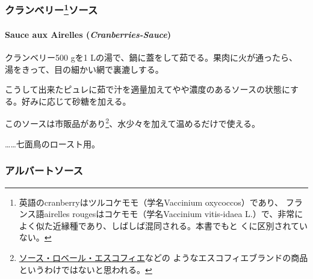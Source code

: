 \begin{recette}
\hypertarget{ux30afux30e9ux30f3ux30d9ux30eaux30fc1ux30bdux30fcux30b9}{%
\subsubsection[クランベリーソース]{\texorpdfstring{クランベリー\footnote{英語のcranberryはツルコケモモ（学名Vaccinium
  oxycoccos）であり、 フランス語airelles rougesはコケモモ（学名Vaccinium
  vitis-idaea
  L.）で、非常によく似た近縁種であり、しばしば混同される。本書でもと
  くに区別されていない。}ソース}{クランベリーソース}}\label{ux30afux30e9ux30f3ux30d9ux30eaux30fc1ux30bdux30fcux30b9}}

\hypertarget{cranberries-sauce}{%
\paragraph{\texorpdfstring{Sauce aux Airelles
(\emph{Cranberries-Sauce})}{Sauce aux Airelles (Cranberries-Sauce)}}\label{cranberries-sauce}}

  
  

クランベリー500 gを1 Lの湯で、鍋に蓋をして茹でる。果肉に火が通ったら、
湯をきって、目の細かい網で裏漉しする。

こうして出来たピュレに茹で汁を適量加えてやや濃度のあるソースの状態にす
る。好みに応じて砂糖を加える。

このソースは市販品があり\footnote{\protect\hyperlink{sauce-robert-escoffier}{ソース・ロベール・エスコフィエ}などの
  ようなエスコフィエブランドの商品というわけではないと思われる。}、水少々を加えて温めるだけで使える。

\ldots{}\ldots{}七面鳥のロースト用。

\maeaki

\hypertarget{ux30a2ux30ebux30d0ux30fcux30c8ux30bdux30fcux30b9}{%
\subsubsection{アルバートソース}\label{ux30a2ux30ebux30d0ux30fcux30c8ux30bdux30fcux30b9}}


\end{recette}
